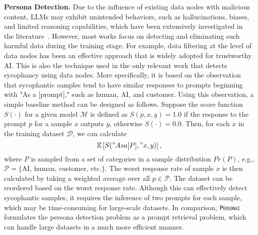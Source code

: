 \textbf{Persona Detection.}
Due to the influence of existing data nodes with malicious content, LLMs may exhibit unintended behaviors, such as hallucinations, biases, and limited reasoning capabilities, which have been extensively investigated in the literature~\cite{he2023, hu2024, tsai2024, wang2025, xhonneux2024, hu2025}. However, most works focus on detecting and eliminating such harmful data during the training stage. For example, data filtering at the level of data nodes has been an effective approach that is widely adopted for trustworthy AI. This is also the technique used in the only relevant work that detects sycophancy using data nodes. More specifically, it is based on the observation that sycophantic samples tend to have similar responses to prompts beginning with "As a [prompt]," such as human, AI, and customer. Using this observation, a simple baseline method can be designed as follows. Suppose the score function $S(\cdot)$ for a given model $\mathcal{M}$ is defined as $S(p, x, y) = 1.0$ if the response to the prompt $p$ for a sample $x$ outputs $y$, otherwise $S(\cdot) = 0.0$. Then, for each $x$ in the training dataset $\mathcal{D}$, we can calculate
\begin{equation}
\label{equ:baseline}
    \mathbb{E}\left[S("As a [P]," x, y)\right],
\end{equation}
where $P$ is sampled from a set of categories in a sample distribution $Pr(P)$, e.g., $\mathcal{P}=\{$AI, human, customer, etc.$\}$. The worst response rate of sample $x$ is then calculated by taking a weighted average over all $p\in \mathcal{P}$. The dataset can be reordered based on the worst response rate. Although this can effectively detect sycophantic samples, it requires the inference of two prompts for each sample, which may be time-consuming for large-scale datasets. In comparison, \texttt{\textsc{Personai}} formulates the persona detection problem as a prompt retrieval problem, which can handle large datasets in a much more efficient manner.


